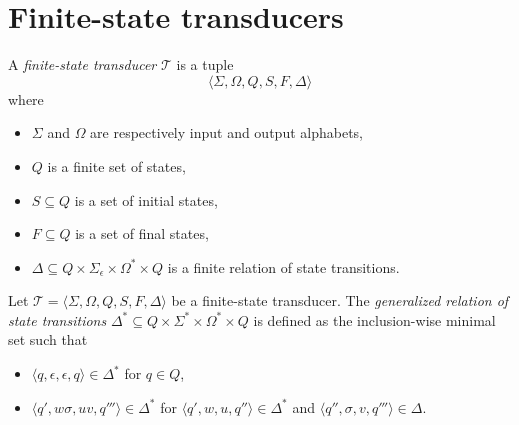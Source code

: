\section{Finite-state transducers}

\begin{definition}
  A \emph{finite-state transducer} $\mathcal{T}$ is a tuple
  \begin{equation*}
    \langle \Sigma, \Omega, Q, S, F, \Delta \rangle
  \end{equation*}
  where
  \begin{itemize}
    \item $\Sigma$ and $\Omega$ are respectively input and output alphabets,
    \item $Q$ is a finite set of states,
    \item $S \subseteq Q$ is a set of initial states,
    \item $F \subseteq Q$ is a set of final states,
    \item $\Delta \subseteq Q \times \Sigma_\epsilon \times \Omega^* \times Q$ is a
	    finite relation of state transitions.
  \end{itemize}
\end{definition}

\begin{definition}
  Let $\mathcal{T} = \langle \Sigma, \Omega, Q, S, F, \Delta \rangle$ be a
  finite-state transducer. The \emph{generalized relation of state transitions}
  $\Delta^* \subseteq Q \times \Sigma^* \times \Omega^* \times Q$ is defined as the
  inclusion-wise minimal set such that
  \begin{itemize}
    \item $\langle q, \epsilon, \epsilon, q \rangle \in \Delta^*$ for $q \in Q$,
    \item $\langle q', w\sigma, uv, q''' \rangle \in \Delta^*$ for $\langle q', w, u,
	    q'' \rangle \in \Delta^*$ and $\langle q'', \sigma, v, q''' \rangle \in
	    \Delta$.
  \end{itemize}
\end{definition}

